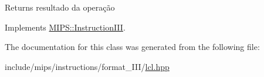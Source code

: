 \begin{DoxyReturn}{Returns}
resultado da operação 
\end{DoxyReturn}


Implements \hyperlink{classMIPS_1_1InstructionIII_aee3071c23abc542e55b446abee766c5e}{M\+I\+P\+S\+::\+Instruction\+I\+II}.



The documentation for this class was generated from the following file\+:\begin{DoxyCompactItemize}
\item 
include/mips/instructions/format\+\_\+\+I\+I\+I/\hyperlink{lcl_8hpp}{lcl.\+hpp}\end{DoxyCompactItemize}

